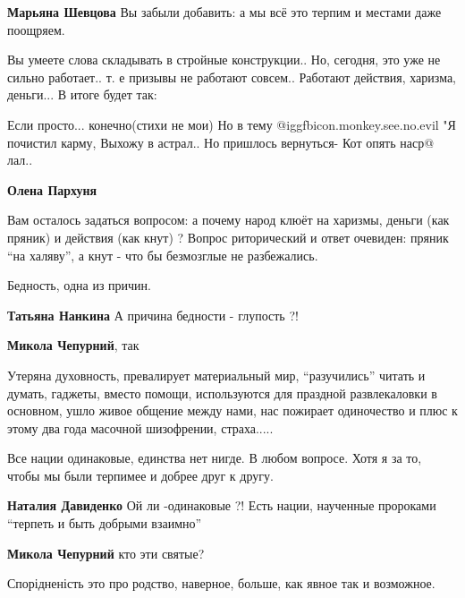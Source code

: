 \begin{itemize}
\textbf{Марьяна Шевцова} Вы забыли добавить: а мы всё это терпим и местами даже поощряем.


Вы умеете слова складывать в стройные конструкции.. Но, сегодня, это уже не
сильно работает.. т. е призывы не работают совсем.. Работают действия,
харизма, деньги... В итоге будет так:

Если просто... конечно(стихи не мои)
Но в тему @igg{fbicon.monkey.see.no.evil} 
"Я почистил карму,
Выхожу в астрал..
Но пришлось вернуться-
Кот опять наср@ лал..

\begin{itemize} %
\textbf{Олена Пархуня} 

Вам осталось задаться вопросом: а почему народ клюёт на харизмы, деньги (как
пряник) и действия (как кнут) ? Вопрос риторический и ответ очевиден: пряник
\enquote{на халяву}, а кнут - что бы безмозглые не разбежались.

\end{itemize} %

Бедность, одна из причин.

\textbf{Татьяна Нанкина} А причина бедности - глупость ?!

\textbf{Микола Чепурний}, так


Утеряна духовность, превалирует материальный мир, \enquote{разучились} читать и
думать, гаджеты, вместо помощи, используются для праздной развлекаловки в
основном, ушло живое общение между нами, нас пожирает одиночество и плюс к этому
два года масочной шизофрении, страха.....


Все нации одинаковые, единства нет нигде. В любом вопросе. Хотя я за то, чтобы
мы были терпимее и добрее друг к другу.

\begin{itemize} %
\textbf{Наталия Давиденко} Ой ли -одинаковые ?! Есть нации, наученные пророками \enquote{терпеть и быть добрыми взаимно}

\textbf{Микола Чепурний} кто эти святые?
\end{itemize} %


Спорідненість это про родство, наверное, больше, как явное так и возможное.


\end{itemize}
